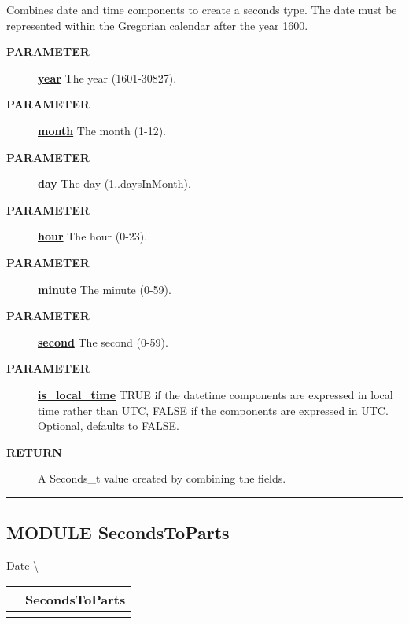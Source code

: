 \par
Combines date and time components to create a seconds type. The date must be represented within the Gregorian calendar after the year 1600.

\par
\begin{description}
\item [\colorbox{tagtype}{\color{white} \textbf{\textsf{PARAMETER}}}] \textbf{\underline{year}} The year (1601-30827).
\item [\colorbox{tagtype}{\color{white} \textbf{\textsf{PARAMETER}}}] \textbf{\underline{month}} The month (1-12).
\item [\colorbox{tagtype}{\color{white} \textbf{\textsf{PARAMETER}}}] \textbf{\underline{day}} The day (1..daysInMonth).
\item [\colorbox{tagtype}{\color{white} \textbf{\textsf{PARAMETER}}}] \textbf{\underline{hour}} The hour (0-23).
\item [\colorbox{tagtype}{\color{white} \textbf{\textsf{PARAMETER}}}] \textbf{\underline{minute}} The minute (0-59).
\item [\colorbox{tagtype}{\color{white} \textbf{\textsf{PARAMETER}}}] \textbf{\underline{second}} The second (0-59).
\item [\colorbox{tagtype}{\color{white} \textbf{\textsf{PARAMETER}}}] \textbf{\underline{is\_local\_time}} TRUE if the datetime components are expressed in local time rather than UTC, FALSE if the components are expressed in UTC. Optional, defaults to FALSE.
\item [\colorbox{tagtype}{\color{white} \textbf{\textsf{RETURN}}}] \textbf{\underline{}} A Seconds\_t value created by combining the fields.
\end{description}

\rule{\linewidth}{0.5pt}
\subsection*{\textsf{\colorbox{headtoc}{\color{white} MODULE}
SecondsToParts}}

\hypertarget{ecldoc:date.secondstoparts}{}
\hspace{0pt} \hyperlink{ecldoc:Date}{Date} \textbackslash 

{\renewcommand{\arraystretch}{1.5}
\begin{tabularx}{\textwidth}{|>{\raggedright\arraybackslash}l|X|}
\hline
\hspace{0pt}\mytexttt{\color{red} } & \textbf{SecondsToParts} \\
\hline
\multicolumn{2}{|>{\raggedright\arraybackslash}X|}{\hspace{0pt}\mytexttt{\color{param} (Seconds\_t seconds)}} \\
\hline
\end{tabularx}
}

